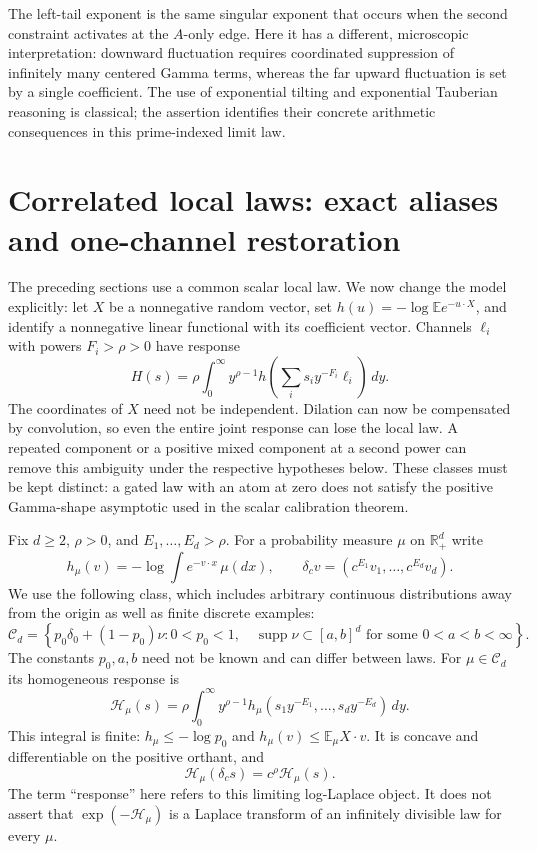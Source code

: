 \documentclass[11pt,letterpaper]{article}
\theoremstyle{definition}
\theoremstyle{remark}
\newcommand{\1}{\mathbf 1}
\begin{document}
The left-tail exponent is the same singular exponent that occurs
when the second constraint activates at the $A$-only edge.  Here
it has a different, microscopic interpretation: downward fluctuation
requires coordinated suppression of infinitely many centered Gamma
terms, whereas the far upward fluctuation is set by a single
coefficient.  The use of exponential tilting and exponential
Tauberian reasoning is classical; the assertion identifies their
concrete arithmetic consequences in this prime-indexed limit law.

\section{Correlated local laws: exact aliases and one-channel restoration}
\label{p06:sec:correlated-identification}

The preceding sections use a common scalar local law. We now change
the model explicitly: let $X$ be a nonnegative random vector, set
$h(u)=-\log\mathbb E e^{-u\cdot X}$, and identify a nonnegative linear
functional with its coefficient vector. Channels $\ell_i$ with powers
$F_i>\rho>0$ have response
\begin{equation}\label{p06:eq:intro-response}
 H(s)=\rho\int_0^\infty y^{\rho-1}
 h\left(\sum_i s_i y^{-F_i}\ell_i\right)\,dy.
\end{equation}
The coordinates of $X$ need not be independent. Dilation can now be
compensated by convolution, so even the entire joint response can
lose the local law. A repeated component or a positive mixed component
at a second power can remove this ambiguity under the respective
hypotheses below. These classes must be kept distinct: a gated law
with an atom at zero does not satisfy the positive Gamma-shape
asymptotic used in the scalar calibration theorem.

Fix $d\ge2$, $\rho>0$, and $E_1,\ldots,E_d>\rho$.
For a probability measure $\mu$ on $\mathbb R_+^d$ write
\[
 h_\mu(v)=-\log\int e^{-v\cdot x}\,\mu(dx),\qquad
 \delta_c v=(c^{E_1}v_1,\ldots,c^{E_d}v_d).
\]
We use the following class, which includes arbitrary continuous distributions
away from the origin as well as finite discrete examples:
\begin{equation}\label{p06:eq:origin-gap-class}
 \mathcal C_d=\left\{p_0\delta_0+(1-p_0)\nu:
 0<p_0<1,\quad\operatorname{supp}\nu\subset[a,b]^d
 \text{ for some }0<a<b<\infty\right\}.
\end{equation}
The constants $p_0,a,b$ need not be known and can differ between laws.
For $\mu\in\mathcal C_d$ its homogeneous response is
\begin{equation}\label{p06:eq:correlated-H}
 \mathcal H_\mu(s)=\rho\int_0^\infty
 y^{\rho-1}h_\mu(s_1y^{-E_1},\ldots,s_dy^{-E_d})\,dy.
\end{equation}
This integral is finite: $h_\mu\le-\log p_0$ and
$h_\mu(v)\le\mathbb E_\mu X\cdot v$.
It is concave and differentiable on the positive orthant, and
\[
 \mathcal H_\mu(\delta_c s)=c^\rho\mathcal H_\mu(s).
\]
The term ``response'' here refers to this limiting log-Laplace object.
It does not assert that $\exp(-\mathcal H_\mu)$ is a Laplace transform
of an infinitely divisible law for every $\mu$.
\end{document}
